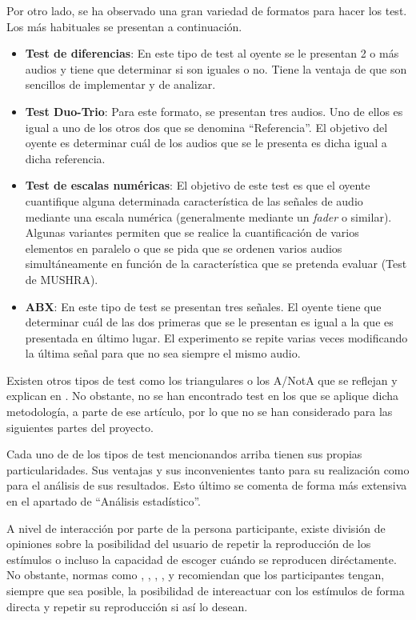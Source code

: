 \documentclass[11pt,a4paper]{book}
\begin{document}
    Por otro lado, se ha observado una gran variedad de formatos para hacer los test. Los más habituales se presentan a continuación.
    
    \begin{itemize}
        \item \textbf{Test de diferencias}: En este tipo de test al oyente se le presentan 2 o más audios y tiene que determinar si son iguales o no. Tiene la ventaja de que son sencillos de implementar y de analizar.
        \item \textbf{Test Duo-Trio}: Para este formato, se presentan tres audios. Uno de ellos es igual a  uno de los otros dos que se denomina ``Referencia''. El objetivo del oyente es determinar cuál de los audios que se le presenta es dicha igual a dicha referencia.
        \item \textbf{Test de escalas numéricas}: El objetivo de este test es que el oyente cuantifique alguna determinada característica de las señales de audio mediante una escala numérica (generalmente mediante un \textit{fader} o similar). Algunas variantes permiten que se realice la cuantificación de varios elementos en paralelo o que se pida que se ordenen varios audios simultáneamente en función de la característica que se pretenda evaluar (Test de MUSHRA).
        \item \textbf{ABX}: En este tipo de test se presentan tres señales. El oyente tiene que determinar cuál de las dos primeras que se le presentan es igual a la que es presentada en último lugar. El experimento se repite varias veces modificando la última señal para que no sea siempre el mismo audio. 
    \end{itemize}
    Existen otros tipos de test como los triangulares o los A/NotA que se reflejan y explican en \cite{delaPrida2021}. No obstante, no se han encontrado test en los que se aplique dicha metodología, a parte de ese artículo, por lo que no se han considerado para las siguientes partes del proyecto.
    
    Cada uno de de los tipos de test mencionandos arriba tienen sus propias particularidades. Sus ventajas y sus inconvenientes tanto para su realización como para el análisis de sus resultados. Esto último se comenta de forma más extensiva en el apartado de ``Análisis estadístico''. 
    
    A nivel de interacción por parte de la persona participante, existe división de opiniones sobre la posibilidad del usuario de repetir la reproducción de los estímulos o incluso la capacidad de escoger cuándo se reproducen diréctamente. No obstante, normas como \cite{UIT1116}, \cite{UIT1534}, \cite{UIT1284}, \cite{EBU3286}, \cite{UIT1285} y \cite{UIT1286} recomiendan que los participantes tengan, siempre que sea posible, la posibilidad de intereactuar con los estímulos de forma directa y repetir su reproducción si así lo desean.
    
\end{document}
